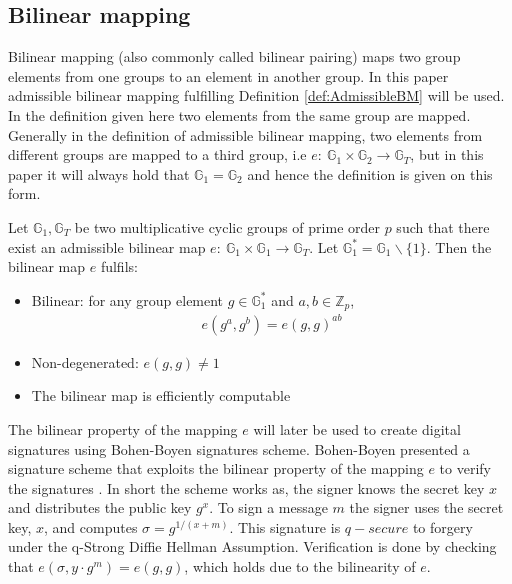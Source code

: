 \subsection*{Bilinear mapping}
\label{sec:bilinear}
Bilinear mapping (also commonly called bilinear pairing) maps two group elements from one groups to an element in another group. In this paper admissible bilinear mapping fulfilling Definition \ref{def:AdmissibleBM} will be used. In the definition given here two elements from the same group are mapped.  Generally in the definition of admissible bilinear mapping,  two elements from different groups are mapped to a third group, i.e $e: \: \mathds{G}_1\times \mathds{G}_2 \to \mathds{G}_T$, but in this paper it will always hold that $\mathds{G}_1=\mathds{G}_2$ and hence the definition is given on this form. 
\begin{Mydef}
	\label{def:AdmissibleBM}
	Let $\mathds{G}_1,\mathds{G}_T$ be two multiplicative cyclic groups of prime order $p$ such that there exist an admissible bilinear map $e: \: \mathds{G}_1\times \mathds{G}_1 \to \mathds{G}_T$. Let $\mathds{G}_1^*=\mathds{G}_1\backslash \{1\}$.  Then the bilinear map $e$ fulfils:
	\begin{itemize}
		\item Bilinear: for any group element  $g\in\mathds{G}_1^*$ and $a,b \in \mathds{Z}_p$,
		\begin{align*}
			e(g^a,g^b) = e(g,g)^{ab}
		\end{align*}	
		\item Non-degenerated: $e(g,g)\neq 1$	 
		\item The bilinear map is efficiently computable
	\end{itemize}
\end{Mydef}

The bilinear property of the mapping $e$ will later be used to create digital signatures using Bohen-Boyen signatures scheme. Bohen-Boyen presented a signature scheme that exploits the bilinear property of the mapping $e$ to verify the signatures \cite{Bohen-Boyen}.  In short the scheme works as, the signer knows the secret key $x$ and distributes the public key $g^x$. To sign a message $m$ the signer uses the secret key, $x$, and computes $\sigma = g^{1/(x+m)}$. This signature is $q-secure$ to forgery under the q-Strong Diffie Hellman Assumption. Verification is done by checking that $e(\sigma,y\cdot g^m) = e(g,g)$, which holds due to the bilinearity of $e$. 


